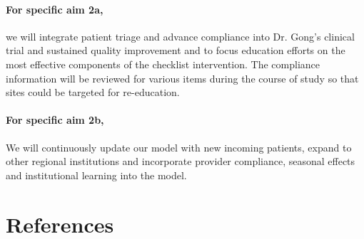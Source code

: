 \documentclass[11pt,notitlepage]{article}
\begin{document}
\paragraph*{For specific aim 2a,} we will integrate patient triage and advance compliance into Dr. Gong's clinical trial and sustained quality improvement and to focus education efforts on the most effective components of the checklist intervention. The compliance information will be reviewed for various items during the course of study so that sites could be targeted for re-education.

\paragraph*{For specific aim 2b,} We will continuously update our model with new incoming patients, expand to other regional institutions and incorporate provider compliance, seasonal effects and institutional learning into the model.




\section*{References}


\newpage


\end{document}
